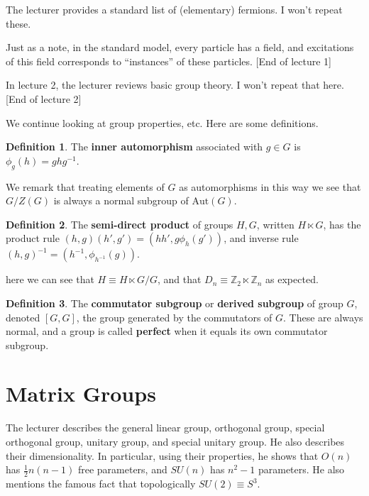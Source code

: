 \documentclass{article}
\theoremstyle{definition}
\newtheorem{definition}{Definition}
\begin{document}
The lecturer provides a standard list of (elementary) fermions. I won't repeat
these.

Just as a note, in the standard model, every particle has a field, and
excitations of this field corresponds to ``instances'' of these particles.
[End of lecture 1]

In lecture 2, the lecturer reviews basic group theory. I won't repeat that here.
[End of lecture 2]

We continue looking at group properties, etc. Here are some definitions.

\begin{definition}
  The \textbf{inner automorphism} associated with $g \in G$ is $\phi_g(h) =
  ghg^{-1}$.
\end{definition}

We remark that treating elements of $G$ as automorphisms in this way we see that
$G / Z(G)$ is always a normal subgroup of $\text{Aut}(G)$.

\begin{definition}
  The \textbf{semi-direct product} of groups $H, G$, written $H \ltimes G$, has the
  product rule $(h, g)(h', g') = (hh', g\phi_h(g'))$, and inverse rule $(h,
  g)^{-1} = (h^{-1}, \phi_{h^{-1}}(g))$.
\end{definition}

here we can see that $H \equiv H \ltimes G / G$, and that $D_n \equiv
\mathbb{Z}_2 \ltimes \mathbb{Z}_n$ as expected.

\begin{definition}
  The \textbf{commutator subgroup} or \textbf{derived subgroup} of group $G$, denoted $[G, G]$,
  the group generated by the commutators of $G$. These are always normal, and a
  group is called \textbf{perfect} when it equals its own commutator subgroup.
\end{definition}

\section{Matrix Groups}

The lecturer describes the general linear group, orthogonal group, special
orthogonal group, unitary group, and special unitary group. He also describes
their dimensionality. In particular, using their properties, he shows that
$O(n)$ has $\frac{1}{2}n(n - 1)$ free parameters, and $SU(n)$ has $n^2 - 1$
parameters. He also mentions the famous fact that topologically $SU(2) \equiv
S^3$.
\end{document}
